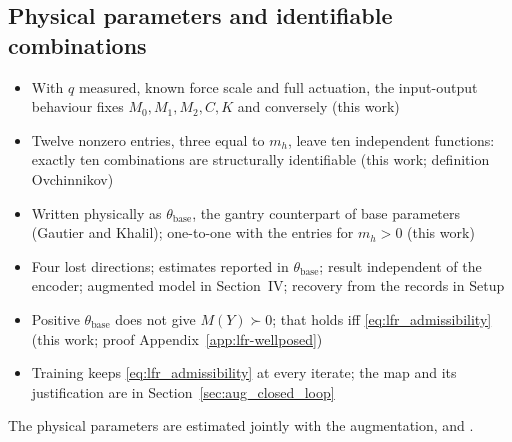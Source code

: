 \subsection{Physical parameters and identifiable combinations}\label{sec:params}
\ifdraft
\begin{itemize}
\item With $q$ measured, known force scale and full actuation, the input-output behaviour fixes $M_0,M_1,M_2,C,K$ and conversely (this work)
\item Twelve nonzero entries, three equal to $m_h$, leave ten independent functions: exactly ten combinations are structurally identifiable (this work; definition Ovchinnikov)
\item Written physically as $\theta_{\mathrm{base}}$, the gantry counterpart of base parameters (Gautier and Khalil); one-to-one with the entries for $m_h>0$ (this work)
\item Four lost directions; estimates reported in $\theta_{\mathrm{base}}$; result independent of the encoder; augmented model in Section~IV; recovery from the records in Setup
\item Positive $\theta_{\mathrm{base}}$ does not give $M(Y)\succ0$; that holds iff \eqref{eq:lfr_admissibility} (this work; proof Appendix~\ref{app:lfr-wellposed})
\item Training keeps \eqref{eq:lfr_admissibility} at every iterate; the map and its justification are in Section~\ref{sec:aug_closed_loop}
\end{itemize}
\fi
The physical parameters are estimated jointly with the
augmentation, and .
%
%
